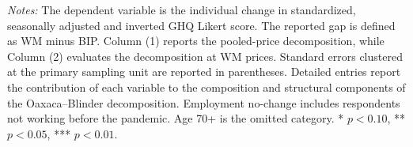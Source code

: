 \begin{landscape}
\vspace{-0.8em}
\noindent\parbox{0.95\linewidth}{\footnotesize \textit{Notes:} The dependent variable is the individual change in standardized, seasonally adjusted and inverted GHQ Likert score. The reported gap is defined as WM minus BIP. Column (1) reports the pooled-price decomposition, while Column (2) evaluates the decomposition at WM prices. Standard errors clustered at the primary sampling unit are reported in parentheses. Detailed entries report the contribution of each variable to the composition and structural components of the Oaxaca--Blinder decomposition. Employment no-change includes respondents not working before the pandemic. Age 70+ is the omitted category. * \(p<0.10\), ** \(p<0.05\), *** \(p<0.01\).}
\end{landscape}